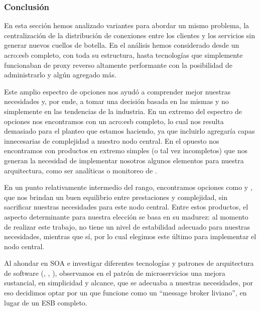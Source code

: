 \subsubsection{Conclusión}

En esta sección hemos analizado variantes para abordar un mismo problema, la centralización de la distribución de conexiones entre los clientes y los servicios sin generar nuevos cuellos de botella. En el análisis hemos considerado desde un \gls{acro:esb} completo, con toda su estructura, hasta tecnologías que simplemente funcionaban de proxy reverso altamente performante con la posibilidad de administrarlo y algún agregado más.

Este amplio espectro de opciones nos ayudó a comprender mejor nuestras necesidades y, por ende, a tomar una decisión basada en las mismas y no simplemente en las tendencias de la industria. En un extremo del espectro de opciones nos encontramos con un \gls{acro:esb} completo, lo cual nos resulta demasiado para el planteo que estamos haciendo, ya que incluirlo agregaría capas innecesarias de complejidad a nuestro nodo central. En el opuesto nos encontramos con productos en extremo simples (o tal vez incompletos) que nos generan la necesidad de implementar nosotros algunos elementos para nuestra arquitectura, como ser analíticas o monitoreo de .

En un punto relativamente intermedio del rango, encontramos opciones como  y , que nos brindan un buen equilibrio entre prestaciones y complejidad, sin sacrificar nuestras necesidades para este nodo central. Entre estos productos, el aspecto determinante para nuestra elección se basa en su madurez: al momento de realizar este trabajo,  no tiene un nivel de estabilidad adecuado para nuestras necesidades, mientras que  sí, por lo cual elegimos este último para implementar el nodo central.

Al ahondar en SOA e investigar diferentes tecnologías y patrones de arquitectura de software (, , ), observamos en el patrón de microservicios una mejora sustancial, en simplicidad y alcance, que se adecuaba a nuestras necesidades, por eso decidimos optar por un  que funcione como un ``message broker liviano'', en lugar de un ESB completo.

